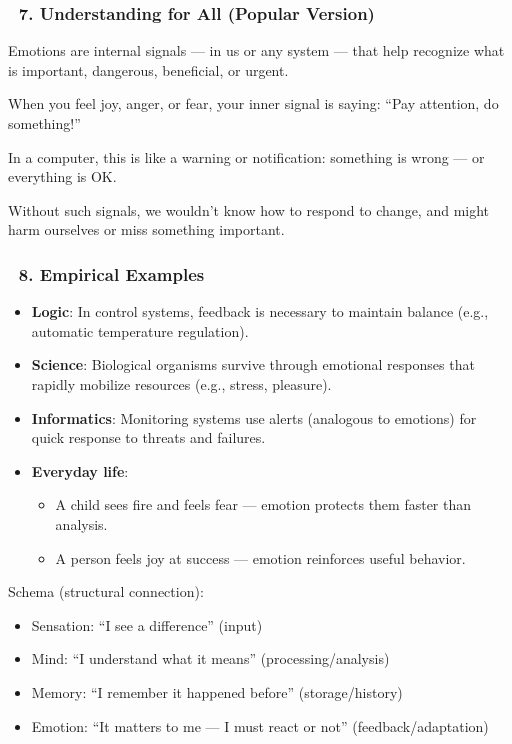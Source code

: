 \documentclass[12pt]{article}
\begin{document}
\subsubsection*{🔹 7. Understanding for All (Popular Version)}

Emotions are internal signals — in us or any system — that help recognize what is important, dangerous, beneficial, or urgent.

When you feel joy, anger, or fear, your inner signal is saying: ``Pay attention, do something!''

In a computer, this is like a warning or notification: something is wrong — or everything is OK.

Without such signals, we wouldn’t know how to respond to change, and might harm ourselves or miss something important.

\subsubsection*{🔹 8. Empirical Examples}

\begin{itemize}
\item \textbf{Logic}: In control systems, feedback is necessary to maintain balance (e.g., automatic temperature regulation).
\item \textbf{Science}: Biological organisms survive through emotional responses that rapidly mobilize resources (e.g., stress, pleasure).
\item \textbf{Informatics}: Monitoring systems use alerts (analogous to emotions) for quick response to threats and failures.
\item \textbf{Everyday life}:
  \begin{itemize}
    \item A child sees fire and feels fear — emotion protects them faster than analysis.
    \item A person feels joy at success — emotion reinforces useful behavior.
  \end{itemize}
\end{itemize}

Schema (structural connection):

\begin{itemize}
\item Sensation: ``I see a difference'' (input)
\item Mind: ``I understand what it means'' (processing/analysis)
\item Memory: ``I remember it happened before'' (storage/history)
\item Emotion: ``It matters to me — I must react or not'' (feedback/adaptation)
\end{itemize}
\end{document}
